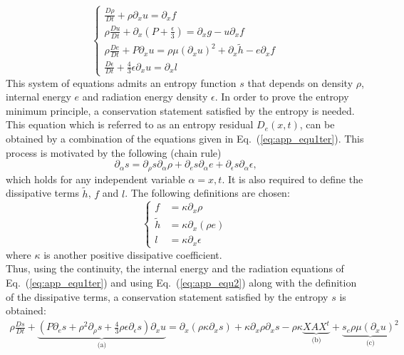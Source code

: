 \documentclass[review]{elsarticle}
\newcommand{\eqt}[1]{Eq.~(\ref{#1})}                     %
\begin{document}
\begin{appendices}
\begin{equation}
\label{eq:app_equ1ter}
\left\{
\begin{array}{llll}
\frac{D \rho}{Dt} + \rho \partial_x u = \partial_x f \\
\rho \frac{Du}{Dt} + \partial_x \left( P + \frac{\epsilon}{3} \right) = \partial_x g - u \partial_x f  \\
\rho \frac{De}{Dt} + P \partial_x u = \rho \mu (\partial_x u)^2 + \partial_x \tilde{h} - e \partial_x f \\
\frac{D\epsilon}{Dt} + \frac{4}{3} \epsilon \partial_x u = \partial_x l
\end{array}
\right.
\end{equation}
This system of equations admits an entropy function $s$ that depends on density $\rho$, internal energy $e$ and radiation energy density $\epsilon$. In order to prove the entropy minimum principle, a conservation statement satisfied by the entropy is needed. This equation which is referred to as an entropy residual $D_e(x,t)$, can be obtained by a combination of the equations given in \eqt{eq:app_equ1ter}. This process is motivated by the following (chain rule) 
\begin{equation}
\label{eq:app_equ2}
\partial_{\alpha} s = \partial_{\rho} s \partial_{\alpha} \rho +  \partial_{e} s \partial_{\alpha}e +  \partial_{\epsilon} s \partial_{\alpha} \epsilon \text{,}
\end{equation}
 which holds for any independent variable $\alpha=x,t$. It is also required to define the dissipative terms $\tilde{h}$, $f$ and $l$. The following definitions are chosen:
 \begin{equation}
 \left\{
 \begin{array}{ccc}
f &= \kappa \partial_x \rho \\
\tilde{h} &= \kappa \partial_x (\rho e) \\
l &= \kappa \partial_x \epsilon
 \end{array}
 \right.
 \end{equation}
 where $\kappa$ is another positive dissipative coefficient. \\
 Thus, using the continuity, the internal energy and the radiation equations of \eqt{eq:app_equ1ter} and using \eqt{eq:app_equ2} along with the definition of the dissipative terms, a conservation statement satisfied by the entropy $s$ is obtained:
 \begin{eqnarray}
 \label{eq:app_equ3}
\rho \frac{Ds}{Dt} + \underbrace{\left( P \partial_e s + \rho^2 \partial_{\rho} s + \frac{4}{3} \rho \epsilon \partial_{\epsilon} s \right) \partial_x u}_\textrm{(a)} = \partial_x \left( \rho \kappa \partial_x s \right) + \kappa \partial_x \rho \partial_x s - \rho \kappa \underbrace{X A X^t}_\textrm{(b)} + \underbrace{ s_e \rho \mu (\partial_x u)^2}_\textrm{(c)}

\end{eqnarray}
\end{appendices}
\end{document}
